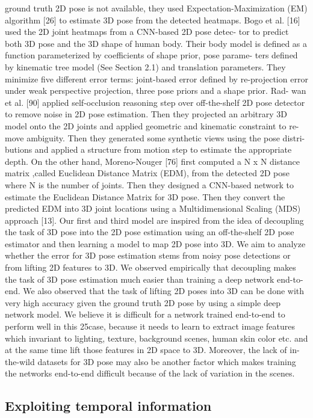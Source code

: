 ground truth 2D pose is not available, they used Expectation-Maximization (EM)
algorithm [26] to estimate 3D pose from the detected heatmaps.
Bogo et al. [16] used the 2D joint heatmaps from a CNN-based 2D pose detec-
tor to predict both 3D pose and the 3D shape of human body. Their body model
is defined as a function parameterized by coefficients of shape prior, pose parame-
ters defined by kinematic tree model (See Section 2.1) and translation parameters.
They minimize five different error terms: joint-based error defined by re-projection
error under weak perspective projection, three pose priors and a shape prior. Rad-
wan et al. [90] applied self-occlusion reasoning step over off-the-shelf 2D pose
detector to remove noise in 2D pose estimation. Then they projected an arbitrary
3D model onto the 2D joints and applied geometric and kinematic constraint to re-
move ambiguity. Then they generated some synthetic views using the pose distri-
butions and applied a structure from motion step to estimate the appropriate depth.
On the other hand, Moreno-Nouger [76] first computed a N x N distance matrix
,called Euclidean Distance Matrix (EDM), from the detected 2D pose where N is
the number of joints. Then they designed a CNN-based network to estimate the
Euclidean Distance Matrix for 3D pose. Then they convert the predicted EDM into
3D joint locations using a Multidimensional Scaling (MDS) approach [13].
Our first and third model are inspired from the idea of decoupling the task
of 3D pose into the 2D pose estimation using an off-the-shelf 2D pose estimator
and then learning a model to map 2D pose into 3D. We aim to analyze whether
the error for 3D pose estimation stems from noisy pose detections or from lifting
2D features to 3D. We observed empirically that decoupling makes the task of 3D
pose estimation much easier than training a deep network end-to-end. We also
observed that the task of lifting 2D poses into 3D can be done with very high
accuracy given the ground truth 2D pose by using a simple deep network model.
We believe it is difficult for a network trained end-to-end to perform well in this
25case, because it needs to learn to extract image features which invariant to lighting,
texture, background scenes, human skin color etc. and at the same time lift those
features in 2D space to 3D. Moreover, the lack of in-the-wild datasets for 3D pose
may also be another factor which makes training the networks end-to-end difficult
because of the lack of variation in the scenes.

\subsection{Exploiting temporal information}

